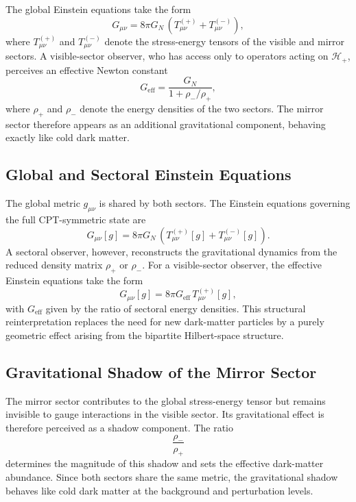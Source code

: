 \documentclass[11pt,a4paper]{article}
\begin{document}
The global Einstein equations take the form
\begin{equation}
    G_{\mu\nu}
        = 8\pi G_{N}\,
          \left(T^{(+)}_{\mu\nu} + T^{(-)}_{\mu\nu}\right),
\end{equation}
where \(T^{(+)}_{\mu\nu}\) and \(T^{(-)}_{\mu\nu}\) denote the stress-energy tensors
of the visible and mirror sectors. A visible-sector observer, who has access
only to operators acting on \(\mathcal{H}_{+}\), perceives an effective Newton
constant
\begin{equation}
    G_{\mathrm{eff}}
        = \frac{G_{N}}{1 + \rho_{-}/\rho_{+}},
\end{equation}
where \(\rho_{+}\) and \(\rho_{-}\) denote the energy densities of the two sectors.
The mirror sector therefore appears as an additional gravitational component,
behaving exactly like cold dark matter.

\subsection{Global and Sectoral Einstein Equations}

The global metric \(g_{\mu\nu}\) is shared by both sectors. The Einstein equations
governing the full CPT-symmetric state are
\begin{equation}
    G_{\mu\nu}[g]
        = 8\pi G_{N}\,
          \left(T^{(+)}_{\mu\nu}[g] + T^{(-)}_{\mu\nu}[g]\right).
\end{equation}
A sectoral observer, however, reconstructs the gravitational dynamics from the
reduced density matrix \(\rho_{+}\) or \(\rho_{-}\). For a visible-sector observer,
the effective Einstein equations take the form
\begin{equation}
    G_{\mu\nu}[g]
        = 8\pi G_{\mathrm{eff}}\,
          T^{(+)}_{\mu\nu}[g],
\end{equation}
with \(G_{\mathrm{eff}}\) given by the ratio of sectoral energy densities. This
structural reinterpretation replaces the need for new dark-matter particles by
a purely geometric effect arising from the bipartite Hilbert-space structure.

\subsection{Gravitational Shadow of the Mirror Sector}

The mirror sector contributes to the global stress-energy tensor but remains
invisible to gauge interactions in the visible sector. Its gravitational effect
is therefore perceived as a shadow component. The ratio
\begin{equation}
    \frac{\rho_{-}}{\rho_{+}}
\end{equation}
determines the magnitude of this shadow and sets the effective dark-matter
abundance. Since both sectors share the same metric, the gravitational shadow
behaves like cold dark matter at the background and perturbation levels.
\end{document}
